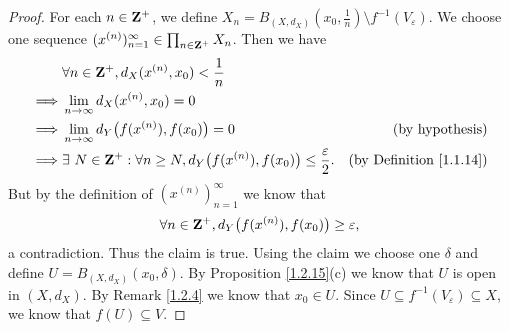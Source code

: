 \begin{proof}
    For each \(n \in \mathbf{Z}^+\), we define \(X_n = B_{(X, d_X)}(x_0, \frac{1}{n}) \setminus f^{-1}(V_\varepsilon)\).
    We choose one sequence \((x^{(n)})_{n = 1}^\infty \in \prod_{n \in \mathbf{Z}^+} X_n\).
    Then we have
    \begin{align*}
                 & \forall n \in \mathbf{Z}^+, d_X(x^{(n)}, x_0) < \frac{1}{n}                                                                                       \\
        \implies & \lim_{n \to \infty} d_X(x^{(n)}, x_0) = 0                                                                                                 \\
        \implies & \lim_{n \to \infty} d_Y\big(f(x^{(n)}), f(x_0)\big) = 0                                             & \text{(by hypothesis)}              \\
        \implies & \exists\ N \in \mathbf{Z}^+ : \forall n \geq N, d_Y\big(f(x^{(n)}), f(x_0)\big) \leq \frac{\varepsilon}{2}. & \text{(by Definition \ref{1.1.14})}
    \end{align*}
    But by the definition of \((x^{(n)})_{n = 1}^\infty\) we know that
    \[
        \forall n \in \mathbf{Z}^+, d_Y\big(f(x^{(n)}), f(x_0)\big) \geq \varepsilon,
    \]
    a contradiction.
    Thus the claim is true.
    Using the claim we choose one \(\delta\) and define \(U = B_{(X, d_X)}(x_0, \delta)\).
    By Proposition \ref{1.2.15}(c) we know that \(U\) is open in \((X, d_X)\).
    By Remark \ref{1.2.4} we know that \(x_0 \in U\).
    Since \(U \subseteq f^{-1}(V_\varepsilon) \subseteq X\), we know that \(f(U) \subseteq V\).


\end{proof}
